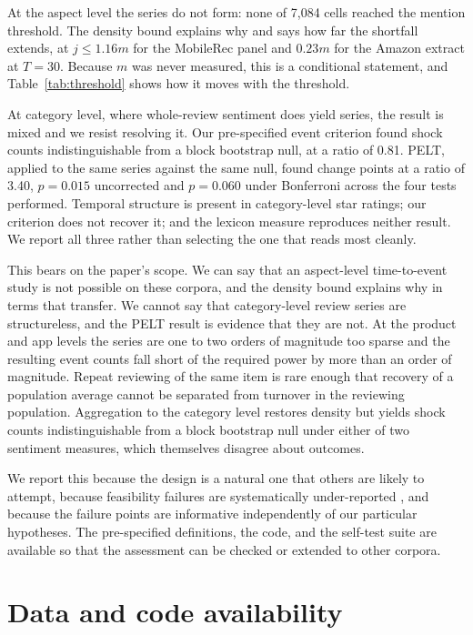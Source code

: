 \documentclass[11pt,a4paper]{article}
\makeatletter
\let\original@section\section
\renewcommand{\section}{\FloatBarrier\original@section}%
\makeatother
\begin{document}
At the aspect level the series do not form: none of 7{,}084 cells reached the
mention threshold. The density bound explains why and says how far the
shortfall extends, at $j \leq 1.16m$ for the MobileRec panel and $0.23m$ for
the Amazon extract at $T = 30$. Because $m$ was never measured, this is a
conditional statement, and Table~\ref{tab:threshold} shows how it moves with
the threshold.

At category level, where whole-review sentiment does yield series, the result
is mixed and we resist resolving it. Our pre-specified event criterion found
shock counts indistinguishable from a block bootstrap null, at a ratio of 0.81.
PELT, applied to the same series against the same null, found change points at
a ratio of 3.40, $p = 0.015$ uncorrected and $p = 0.060$ under Bonferroni
across the four tests performed. Temporal structure is present in
category-level star ratings; our criterion does not recover it; and the lexicon
measure reproduces neither result. We report all three rather than selecting the one
that reads most cleanly.

This bears on the paper's scope. We can say that an aspect-level time-to-event
study is not possible on these corpora, and the density bound explains why in
terms that transfer. We cannot say that category-level review series are
structureless, and the PELT result is evidence that they are not. At the
product and app levels the series are one to two orders of magnitude too
sparse and the resulting event counts fall short of the required power by more
than an order of magnitude. Repeat reviewing of the same item is rare enough
that recovery of a population average cannot be separated from turnover in the
reviewing population. Aggregation to the category level restores density but
yields shock counts indistinguishable from a block bootstrap null under either
of two sentiment measures, which themselves disagree about outcomes.

We report this because the design is a natural one that others are likely to
attempt, because feasibility failures are systematically under-reported
\citep{franco2014}, and because the failure points are informative independently of our
particular hypotheses. The pre-specified definitions, the code, and the self-test suite are
available so that the assessment can be checked or
extended to other corpora.

\section*{Data and code availability}
\end{document}
